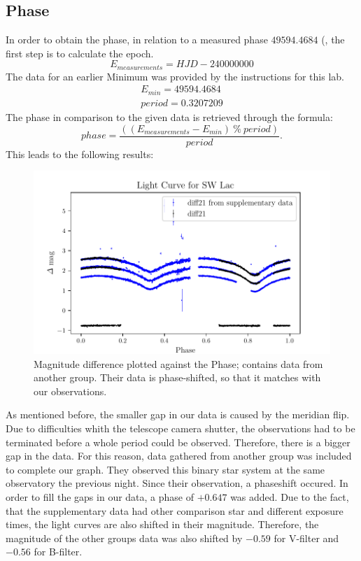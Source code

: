 \subsection{Phase}
  \label{sec:again}
  In order to obtain the phase, in relation to a measured phase $49594.4684$ (, the first step is to calculate the epoch.
  \begin{equation*}
    E_{measurements} = HJD - 240000000
  \end{equation*}
  The data for an earlier Minimum was provided by the 
  instructions for this lab. 
  \begin{align*}
    E_{min} = 49594.4684\\
    period = 0.3207209
  \end{align*}
  The phase in comparison to the given data is retrieved through the formula:
  \begin{equation}
    phase = \dfrac{((E_{measurements}-E_{min})\ \% \ period)}{period}.
  \end{equation}
  This leads to the following results:
  \begin{figure}[H]
    \centering
    \includegraphics{gdPhase.pdf}
    \caption{Magnitude difference plotted against the Phase; contains data from another group. Their data is phase-shifted, so that it matches with our observations.}
    \label{fig:phase}
  \end{figure}
  \noindent As mentioned before, the smaller gap in our data is caused by the meridian flip. 
  Due to difficulties whith the telescope camera shutter, the observations had to be terminated
  before a whole period could be observed. Therefore, there is a bigger gap in the 
  data. For this reason, data gathered from another group was included to complete our graph. 
  They observed this binary star system at the same observatory the previous night. Since their
  observation, a phaseshift occured. In order to fill the gaps in our data,
  a phase of $+0.647$ was added. Due to the fact, that the supplementary data had other 
  comparison star and different exposure times, the light curves are also shifted in their
  magnitude. Therefore, the magnitude of the other groups data was also shifted
  by $-0.59$ for V-filter and $-0.56$ for B-filter.\\
 
